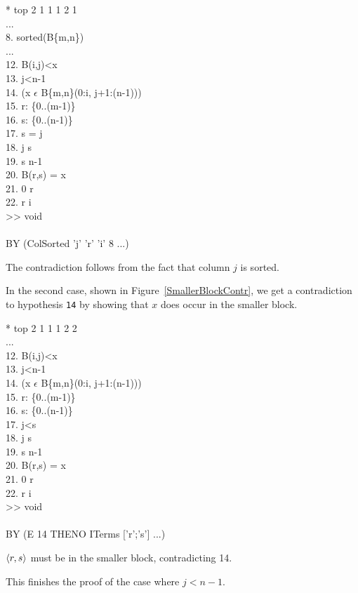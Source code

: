 \begin{RuledFigure}
\begin{Screen}{1}{\SnapshotSize}
\N{}* top 2 1 1 1 2 1 \\{}
\N{}... \\{}
\N{}8. sorted(B\{m,n\}) \\{}
\N{}... \\{}
\N{}12. B(i,j)<x \\{}
\N{}13. j<n-1 \\{}
\N{}14. \mneg{}(x \(\epsilon{}\) B\{m,n\}(0:i, j+1:(n-1))) \\{}
\N{}15. r: \{0..(m-1)\} \\{}
\N{}16. s: \{0..(n-1)\} \\{}
\N{}17. s = j \\{}
\N{}18. j \mleq{} s  \\{}
\N{}19. s \mleq{} n-1 \\{}
\N{}20. B(r,s)  =  x \\{}
\N{}21. 0 \mleq{} r \\{}
\N{}22. r \mleq{} i \\{}
\N{}>> void \\{}
\N{} \\{}
\N{}BY (ColSorted 'j' 'r' 'i' 8 ...) 
\end{Screen}%
\caption{The contradiction follows from the fact that column $j$ is 
sorted.}
\label{ColSortedContr} 
\end{RuledFigure}%
In the second case, shown in Figure~\ref{SmallerBlockContr}, we get a
contradiction to hypothesis {\tt 14} by showing that $x$ does occur in
the smaller block. 
\begin{RuledFigure}
\begin{Screen}{1}{\SnapshotSize}
\N{}* top 2 1 1 1 2 2 \\{}
\N{}... \\{}
\N{}12. B(i,j)<x \\{}
\N{}13. j<n-1 \\{}
\N{}14. \mneg{}(x \(\epsilon{}\) B\{m,n\}(0:i, j+1:(n-1))) \\{}
\N{}15. r: \{0..(m-1)\} \\{}
\N{}16. s: \{0..(n-1)\} \\{}
\N{}17. j<s \\{}
\N{}18. j \mleq{} s  \\{}
\N{}19. s \mleq{} n-1 \\{}
\N{}20. B(r,s)  =  x \\{}
\N{}21. 0 \mleq{} r \\{}
\N{}22. r \mleq{} i \\{}
\N{}>> void \\{}
\N{} \\{}
\N{}BY (E 14 THENO ITerms ['r';'s'] ...) 
\end{Screen}%
\caption{$\langle r,s \rangle$ must be in the smaller block, contradicting 14.}
\label{SmallerBlockContr} 
\end{RuledFigure}
This finishes the proof of the case where $j<n-1$.

